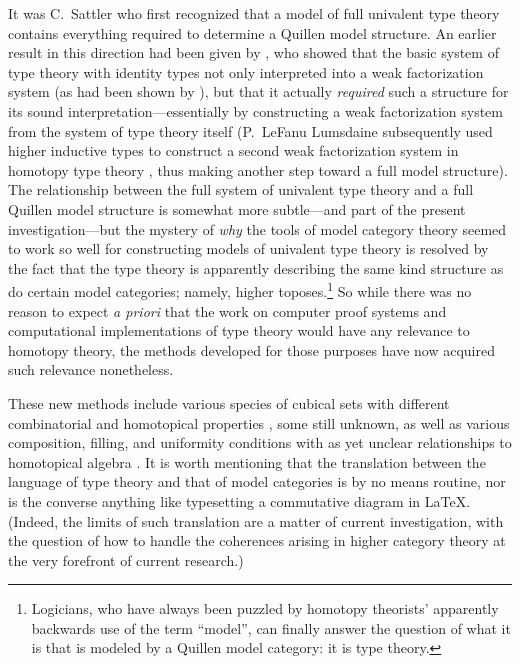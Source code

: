 \documentclass[11pt]{amsart}
\theoremstyle{remark}
\theoremstyle{definition}
\begin{document}
It was C.~Sattler who first recognized that a model of full univalent type theory contains everything required to determine a Quillen model structure. An earlier result in this direction had been given by \cite{GG}, who showed that the basic system of type theory with identity types not only interpreted into a weak factorization system (as had been shown by \cite{AW}), but that it actually \emph{required} such a structure for its sound interpretation---essentially by constructing a weak factorization system from the system of type theory itself (P.~LeFanu Lumsdaine subsequently used higher inductive types to construct a second weak factorization system in homotopy type theory \cite{PLcofibraitons}, thus making another step toward a full model structure).  The relationship between the full system of univalent type theory and a full Quillen model structure is somewhat more subtle---and part of the present investigation---but the mystery of \emph{why} the tools of model category theory seemed to work so well for constructing models of univalent type theory is resolved by the fact that the type theory is apparently describing the same kind structure as do certain model categories; namely, higher toposes.\footnote{Logicians, who have always been puzzled by homotopy theorists' apparently backwards use of the term ``model'', can finally answer the question of what it is that is modeled by a Quillen model category: it is type theory.}  
So while there was no reason to expect \emph{a priori} that the work on computer proof systems and computational implementations of type theory would have any relevance to homotopy theory, the methods developed for those purposes have now acquired such relevance nonetheless. 

These new methods include various species of cubical sets with different combinatorial and homotopical properties \cite{BMcubes}, some still unknown, as well as various composition, filling, and uniformity conditions with as yet unclear relationships to homotopical algebra \cite{OP,CCHM,BCH,Harper,MC}. It is worth mentioning that the translation between the language of type theory and that of model categories is by no means routine, nor is the converse anything like typesetting a commutative diagram in LaTeX.  (Indeed, the limits of such translation are a matter of current investigation, with the question of how to handle the coherences arising in higher category theory at the very forefront of current research.) 
\end{document}
